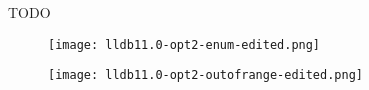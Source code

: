 

TODO

\begin{figure}[h]
    \centering
    \texttt{[image: lldb11.0-opt2-enum-edited.png]}
    \label{fig:lldbenum}
\end{figure}


\begin{figure}[h]
    \centering
    \texttt{[image: lldb11.0-opt2-outofrange-edited.png]}
    \label{fig:lldboutofrange}
\end{figure}

